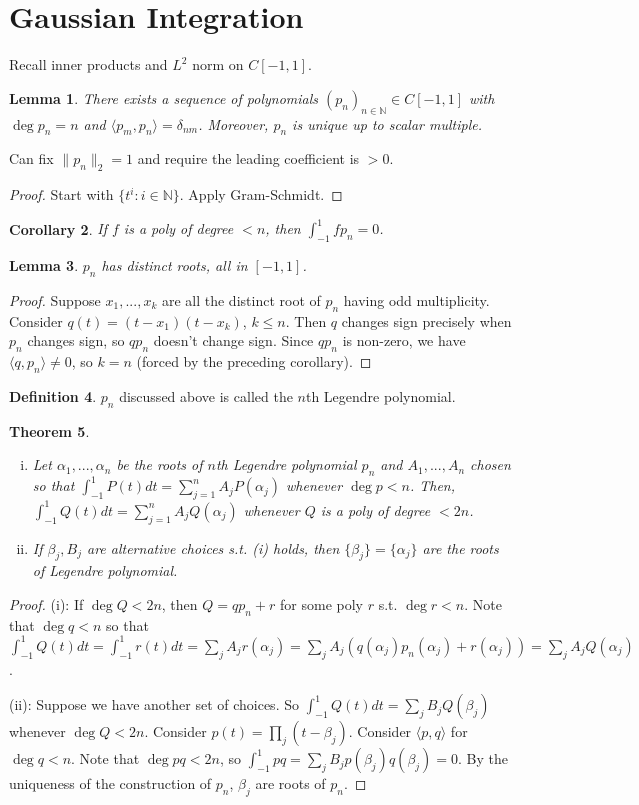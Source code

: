 \documentclass{article}
\theoremstyle{definition}
\newtheorem{defn}{Definition}[section]
\theoremstyle{remark}
\theoremstyle{plain}
\newtheorem{lem}[defn]{Lemma}
\newtheorem{thm}[defn]{Theorem}
\newtheorem{crly}[defn]{Corollary}
\newcommand{\NN}{\mathbb{N}}
\begin{document}
\section{Gaussian Integration}
Recall inner products and $L^2$ norm on $C[-1,1]$.
\begin{lem}
    There exists a sequence of polynomials $(p_n)_{n\in\NN}\in C[-1,1]$ with $\deg p_n=n$ and $\langle p_m,p_n\rangle=\delta_{nm}$. Moreover, $p_n$ is unique up to scalar multiple.
\end{lem}
Can fix $\|p_n\|_2=1$ and require the leading coefficient is $>0$.
\begin{proof}
    Start with $\{t^i:i\in\NN\}$. Apply Gram-Schmidt.
\end{proof}
\begin{crly}
    If $f$ is a poly of degree $<n$, then $\int_{-1}^1fp_n=0$.
\end{crly}
\begin{lem}
    $p_n$ has distinct roots, all in $[-1,1]$.
\end{lem}
\begin{proof}
    Suppose $x_1,...,x_k$ are all the distinct root of $p_n$ having odd multiplicity. Consider $q(t)=(t-x_1)(t-x_k)$, $k\le n$. Then $q$ changes sign precisely when $p_n$ changes sign, so $qp_n$ doesn't change sign. Since $qp_n$ is non-zero, we have $\langle q,p_n\rangle\neq 0$, so $k=n$ (forced by the preceding corollary).
\end{proof}
\begin{defn}
    $p_n$ discussed above is called the $n$th Legendre polynomial.
\end{defn}
\begin{thm}\
    \begin{enumerate}[(i)]
        \item Let $\alpha_1,...,\alpha_n$ be the roots of $n$th Legendre polynomial $p_n$ and $A_1,...,A_n$ chosen so that $\int_{-1}^1P(t)dt=\sum_{j=1}^nA_jP(\alpha_j)$ whenever $\deg p<n$. Then, $\int_{-1}^1Q(t)dt=\sum_{j=1}^nA_jQ(\alpha_j)$ whenever $Q$ is a poly of degree $<2n$.
        \item If $\beta_j,B_j$ are alternative choices s.t. (i) holds, then $\{\beta_j\}=\{\alpha_j\}$ are the roots of Legendre polynomial.
    \end{enumerate}
\end{thm}
\begin{proof}
    (i): If $\deg Q<2n$, then $Q=qp_n+r$ for some poly $r$ s.t. $\deg r<n$. Note that $\deg q<n$ so that 
    $\int_{-1}^1Q(t)dt=\int_{-1}^1 r(t)dt=\sum_jA_jr(\alpha_j)=\sum_j A_j(q(\alpha_j)p_n(\alpha_j)+r(\alpha_j))=\sum_jA_jQ(\alpha_j)$.

    (ii): Suppose we have another set of choices. So $\int_{-1}^1Q(t)dt=\sum_jB_jQ(\beta_j)$ whenever $\deg Q<2n$. Consider $p(t)=\prod_j(t-\beta_j)$. Consider $\langle p,q\rangle$ for $\deg q<n$. Note that $\deg pq<2n$, so $\int_{-1}^1pq=\sum_jB_jp(\beta_j)q(\beta_j)=0$. By the uniqueness of the construction of $p_n$, $\beta_j$ are roots of $p_n$.
\end{proof}
\end{document}
